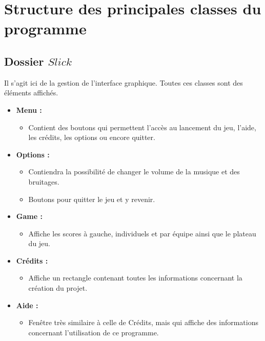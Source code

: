 \documentclass[11pt,a4paper]{article}
\begin{document}
\section{Structure des principales classes du programme}

\subsection{Dossier $Slick$}

Il s'agit ici de la gestion de l'interface graphique. Toutes ces classes sont des éléments affichés.

\begin{itemize}
    \item \textbf{Menu :}
    \begin{itemize} [label=$\Rightarrow$]
    \item Contient des boutons qui permettent l'accès au lancement du jeu, l'aide, les crédits, les options ou encore quitter.
    \end{itemize}
    
    \item \textbf{Options :}
    \begin{itemize} [label=$\Rightarrow$]
    \item Contiendra la possibilité de changer le volume de la musique et des bruitages.
    \item Boutons pour quitter le jeu et y revenir.
    \end{itemize}

    \item \textbf{Game :}
     \begin{itemize} [label=$\Rightarrow$]
    \item Affiche les scores à gauche, individuels et par équipe ainsi que le plateau du jeu.
    \end{itemize}
    
    \item \textbf{Crédits :} 
    \begin{itemize} [label=$\Rightarrow$]
    \item Affiche un rectangle contenant toutes les informations concernant la création du projet.
    \end{itemize}
    
    \item \textbf{Aide :} 
    \begin{itemize} [label=$\Rightarrow$]
    \item Fenêtre très similaire à celle de Crédits, mais qui affiche des informations concernant l'utilisation de ce programme.
    \end{itemize}
    

\end{itemize}
\end{document}
